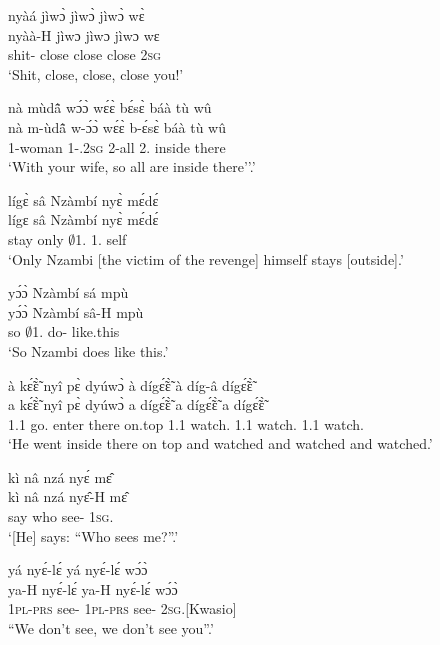 \begin{exe}[(N234)]
\exN\label{n159}
  \glll nyàá jìwɔ̀ jìwɔ̀ jìwɔ̀ wɛ̀ \\
      nyàà-H jìwɔ jìwɔ jìwɔ wɛ \\
        shit-{\R} close close close 2\textsc{sg} \\
    \trans `Shit, close, close, close you!'
 
\exN\label{n160}
  \glll nà mùdã̂ wɔ́ɔ̀ wɛ́ɛ̀ bɛ́sɛ̀ báà tù wû \\
      nà m-ùdã̂ w-ɔ́ɔ̀ wɛ́ɛ̀ b-ɛ́sɛ̀ báà tù wû \\
        {\COM} {\N}1-woman 1-{\POSS}.2\textsc{sg} {\EXCL} 2-all 2.{\COP} inside there \\
    \trans `With your wife, so all are inside there''.'
 
\exN\label{n161}
  \glll lígɛ̀ sâ Nzàmbí nyɛ̀ mɛ́dɛ́ \\
    lígɛ sâ Nzàmbí nyɛ̀ mɛ́dɛ́ \\
       stay only $\emptyset$1.{\PN} 1.{\SBJ} self  \\
    \trans `Only Nzambi [the victim of the revenge] himself stays [outside].'
 
\exN\label{n162}
  \glll yɔ́ɔ̀ Nzàmbí sá mpù \\ 
        yɔ́ɔ̀ Nzàmbí sâ-H mpù \\
        so $\emptyset$1.{\PN} do-{\R} like.this \\
    \trans `So Nzambi does like this.'
 
\exN\label{n163} 
  \glll à kɛ̃́ɛ̃̀ nyî pɛ̀ dyúwɔ̀ à dígɛ̃́ɛ̃̀ à díg-â dígɛ̃́ɛ̃̀\\
        a kɛ̃́ɛ̃̀ nyî pɛ̀ dyúwɔ̀ a dígɛ̃́ɛ̃̀ a dígɛ̃́ɛ̃̀ a dígɛ̃́ɛ̃̀\\
       1.{\PST}1 go.{\COMPL} enter there on.top 1.{\PST}1  watch.{\COMPL} 1.{\PST}1  watch.{\COMPL} 1.{\PST}1 watch.{\COMPL}\\
    \trans `He went inside there on top and watched and watched and watched.'
 
\exN\label{n164}
  \glll kì nâ nzá nyɛ́ mɛ̂ \\
      kì nâ nzá nyɛ̂-H mɛ̂ \\
       say {\COMP} who see-{\R} 1\textsc{sg}.{\OBJ}  \\
    \trans `[He] says: ``Who sees me?''.'
 
\exN\label{n165}
  \glll yá nyɛ́-lɛ́ yá nyɛ́-lɛ́ wɔ́ɔ̀ \\
    ya-H nyɛ́-lɛ́ ya-H nyɛ́-lɛ́ wɔ́ɔ̀ \\
         1\textsc{pl}-\textsc{prs} see-{\NEG} 1\textsc{pl}-\textsc{prs} see-{\NEG} 2\textsc{sg}.{\OBJ}[Kwasio] \\
    \trans ``We don't see, we don't see you''.'
 

\end{exe}

